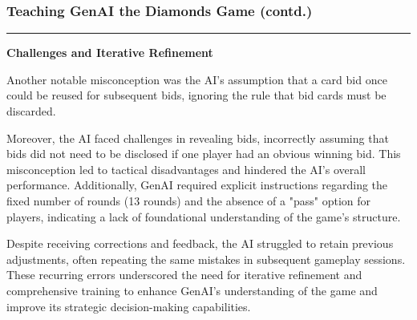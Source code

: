 \documentclass{article}
\begin{document}
\newpage
\begin{frame}
\frametitle{\LARGE Teaching GenAI the Diamonds Game (contd.)}
\vspace{0.5cm}
\centering
\textcolor{gray}{\rule{\linewidth}{0.5pt}}
{\centering\textbf{\LARGE Challenges and Iterative Refinement}\par}

\raggedright
\Large
Another notable misconception was the AI's assumption that a card bid once could be reused for subsequent bids, ignoring the rule that bid cards must be discarded.

\vspace{1cm}
Moreover, the AI faced challenges in revealing bids, incorrectly assuming that bids did not need to be disclosed if one player had an obvious winning bid. This misconception led to tactical disadvantages and hindered the AI's overall performance. Additionally, GenAI required explicit instructions regarding the fixed number of rounds (13 rounds) and the absence of a "pass" option for players, indicating a lack of foundational understanding of the game's structure.

\vspace{1cm}
Despite receiving corrections and feedback, the AI struggled to retain previous adjustments, often repeating the same mistakes in subsequent gameplay sessions. These recurring errors underscored the need for iterative refinement and comprehensive training to enhance GenAI's understanding of the game and improve its strategic decision-making capabilities.


\newpage
\vspace{1cm}
\end{frame}
\end{document}
